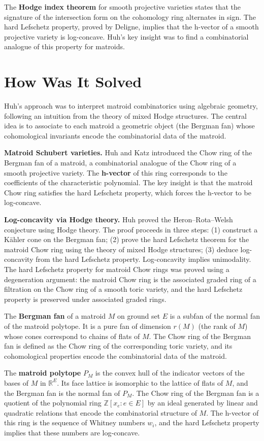 The \textbf{Hodge index theorem} for smooth projective varieties states that the signature of the intersection form on the cohomology ring alternates in sign. The hard Lefschetz property, proved by Deligne, implies that the h-vector of a smooth projective variety is log-concave. Huh's key insight was to find a combinatorial analogue of this property for matroids.

\section{How Was It Solved}

Huh's approach was to interpret matroid combinatorics using algebraic geometry, following an intuition from the theory of mixed Hodge structures. The central idea is to associate to each matroid a geometric object (the Bergman fan) whose cohomological invariants encode the combinatorial data of the matroid.

\textbf{Matroid Schubert varieties.} Huh and Katz introduced the Chow ring of the Bergman fan of a matroid, a combinatorial analogue of the Chow ring of a smooth projective variety. The \textbf{h-vector} of this ring corresponds to the coefficients of the characteristic polynomial. The key insight is that the matroid Chow ring satisfies the hard Lefschetz property, which forces the h-vector to be log-concave.

\textbf{Log-concavity via Hodge theory.} Huh proved the Heron--Rota--Welsh conjecture using Hodge theory. The proof proceeds in three steps: (1) construct a K\"ahler cone on the Bergman fan; (2) prove the hard Lefschetz theorem for the matroid Chow ring using the theory of mixed Hodge structures; (3) deduce log-concavity from the hard Lefschetz property. Log-concavity implies unimodality. The hard Lefschetz property for matroid Chow rings was proved using a degeneration argument: the matroid Chow ring is the associated graded ring of a filtration on the Chow ring of a smooth toric variety, and the hard Lefschetz property is preserved under associated graded rings.

The \textbf{Bergman fan} of a matroid $M$ on ground set $E$ is a subfan of the normal fan of the matroid polytope. It is a pure fan of dimension $r(M)$ (the rank of $M$) whose cones correspond to chains of flats of $M$. The Chow ring of the Bergman fan is defined as the Chow ring of the corresponding toric variety, and its cohomological properties encode the combinatorial data of the matroid.

The \textbf{matroid polytope} $P_M$ is the convex hull of the indicator vectors of the bases of $M$ in $\mathbb{R}^E$. Its face lattice is isomorphic to the lattice of flats of $M$, and the Bergman fan is the normal fan of $P_M$. The Chow ring of the Bergman fan is a quotient of the polynomial ring $\mathbb{Z}[x_e : e \in E]$ by an ideal generated by linear and quadratic relations that encode the combinatorial structure of $M$. The h-vector of this ring is the sequence of Whitney numbers $w_i$, and the hard Lefschetz property implies that these numbers are log-concave.

